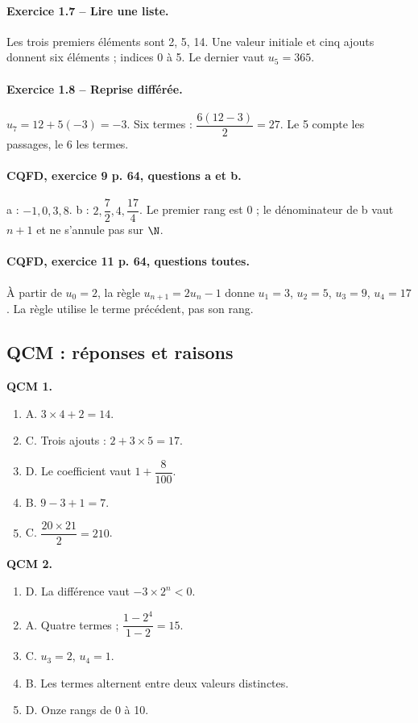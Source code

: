 \paragraph{Exercice 1.7 -- Lire une liste.} Les trois premiers éléments sont 2, 5, 14. Une valeur initiale et cinq ajouts donnent six éléments ; indices 0 à 5. Le dernier vaut $u_5=365$.
\paragraph{Exercice 1.8 -- Reprise différée.} $u_7=12+5(-3)=-3$. Six termes : $\dfrac{6(12-3)}{2}=27$. Le 5 compte les passages, le 6 les termes.
\paragraph{CQFD, exercice 9 p. 64, questions a et b.} a : $-1,0,3,8$. b : $2,\dfrac72,4,\dfrac{17}4$. Le premier rang est 0 ; le dénominateur de b vaut $n+1$ et ne s’annule pas sur $\N$.
\paragraph{CQFD, exercice 11 p. 64, questions toutes.} À partir de $u_0=2$, la règle $u_{n+1}=2u_n-1$ donne $u_1=3$, $u_2=5$, $u_3=9$, $u_4=17$. La règle utilise le terme précédent, pas son rang.
\subsection*{QCM : réponses et raisons}
\textbf{QCM 1.}
\begin{enumerate}
\item A. $3\times4+2=14$.
\item C. Trois ajouts : $2+3\times5=17$.
\item D. Le coefficient vaut $1+\dfrac{8}{100}$.
\item B. $9-3+1=7$.
\item C. $\dfrac{20\times 21}{2}=210$.
\end{enumerate}
\textbf{QCM 2.}
\begin{enumerate}
\item D. La différence vaut $-3\times2^n<0$.
\item A. Quatre termes ; $\dfrac{1-2^4}{1-2}=15$.
\item C. $u_3=2$, $u_4=1$.
\item B. Les termes alternent entre deux valeurs distinctes.
\item D. Onze rangs de 0 à 10.
\end{enumerate}
